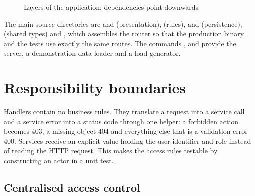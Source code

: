 \begin{figure}[H]
\centering
{}
\caption{Layers of the application; dependencies point downwards}
\label{fig:layers}
\end{figure}

The main source directories are  and  (presentation),  (rules),  and  (persistence),  (shared types) and , which assembles the router so that the production binary and the tests use exactly the same routes. The commands ,  and  provide the server, a demonstration-data loader and a load generator.

\section{Responsibility boundaries}

Handlers contain no business rules. They translate a request into a service call and a service error into a status code through one helper: a forbidden action becomes 403, a missing object 404 and everything else that is a validation error 400. Services receive an explicit  value holding the user identifier and role instead of reading the HTTP request. This makes the access rules testable by constructing an actor in a unit test.

\subsection*{Centralised access control}
\label{sec:access}

